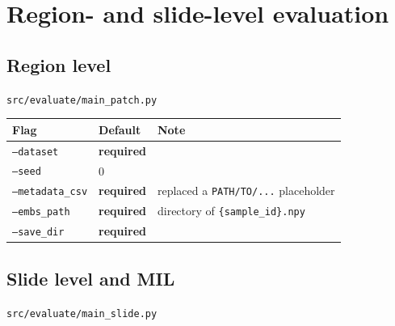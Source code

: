\documentclass[10pt,a4paper]{article}
\newcommand{\req}{\textcolor{eosin}{\textbf{required}}}
\begin{document}
\newpage
\section{Region- and slide-level evaluation}

\subsection{Region level}
\noindent\texttt{src/evaluate/main\_patch.py}

\begin{longtable}{@{}p{4.0cm}p{2.8cm}p{8.8cm}@{}}
\toprule
\textbf{Flag} & \textbf{Default} & \textbf{Note} \\
\midrule \endhead
\texttt{--dataset} & \req & \\
\texttt{--seed} & 0 & \\
\texttt{--metadata\_csv} & \req & replaced a \texttt{PATH/TO/...} placeholder \\
\texttt{--embs\_path} & \req & directory of \texttt{\{sample\_id\}.npy} \\
\texttt{--save\_dir} & \req & \\
\bottomrule
\end{longtable}

\subsection{Slide level and MIL}
\noindent\texttt{src/evaluate/main\_slide.py}
\end{document}
